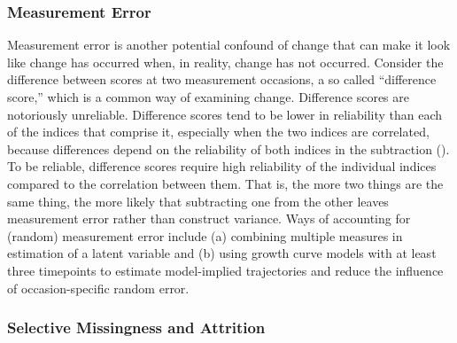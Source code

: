 \documentclass[
  american,
  letterpaper,
  12pt]{article}
\begin{document}
\subsubsection{Measurement Error}\label{measurement-error}

Measurement error is another potential confound of change that can make
it look like change has occurred when, in reality, change has not
occurred. Consider the difference between scores at two measurement
occasions, a so called ``difference score,'' which is a common way of
examining change. Difference scores are notoriously unreliable.
Difference scores tend to be lower in reliability than each of the
indices that comprise it, especially when the two indices are
correlated, because differences depend on the reliability of both
indices in the subtraction (). To be reliable, difference scores require high
reliability of the individual indices compared to the correlation
between them. That is, the more two things are the same thing, the more
likely that subtracting one from the other leaves measurement error
rather than construct variance. Ways of accounting for (random)
measurement error include (a) combining multiple measures in estimation
of a latent variable and (b) using growth curve models with at least
three timepoints to estimate model-implied trajectories and reduce the
influence of occasion-specific random error.

\subsubsection{Selective Missingness and
Attrition}\label{selective-missingness-and-attrition}
\end{document}
